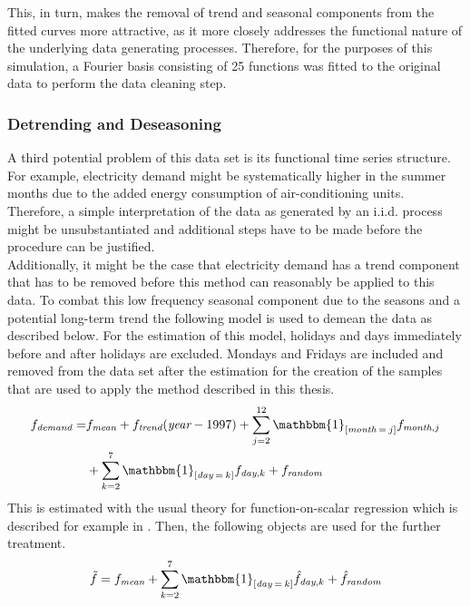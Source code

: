 \documentclass[12pt, a4paper]{article}
\theoremstyle{MAstyle} \newtheorem{assumption}{Assumption}[section]
\theoremstyle{MAstyle} \newtheorem{definition}{Definition}[section]
\theoremstyle{MAstyle} \newtheorem{theorem}{Theorem}[section]
\begin{document}
			This, in turn, makes the removal of trend and seasonal components from the fitted curves more attractive, as it more closely addresses the functional nature of the underlying data generating processes. Therefore, for the purposes of this simulation, a Fourier basis consisting of 25 functions was fitted to the original data to perform the data cleaning step.
			
			\subsubsection{Detrending and Deseasoning}
			A third potential problem of this data set is its functional time series structure. For example, electricity demand might be systematically higher in the summer months due to the added energy consumption of air-conditioning units. Therefore, a simple interpretation of the data as generated by an i.i.d. process might be unsubstantiated and additional steps have to be made before the procedure can be justified. \\
			Additionally, it might be the case that electricity demand has a trend component that has to be removed before this method can reasonably be applied to this data. To combat this low frequency seasonal component due to the seasons and a potential long-term trend the following model is used to demean the data as described below. For the estimation of this model, holidays and days immediately before and after holidays are excluded. Mondays and Fridays are included and removed from the data set after the estimation for the creation of the samples that are used to apply the method described in this thesis.
			\begin{equation}\label{Data_Cleaning}
				\begin{split}
					f_{\textit{demand}} = &f_{\textit{mean}} + f_{\textit{trend}}(\textit{year} - 1997) + \sum_{j = 2}^{12}\mathbbm{1}_{\left[\textit{month}\: = \: j\right]}f_{\textit{month}, j}\\
					 &+ \sum_{k = 2}^{7}\mathbbm{1}_{\left[\textit{day}\: = \: k\right]}f_{\textit{day}, k} + f_{\textit{random}}
				\end{split}	
			\end{equation}
			This is estimated with the usual theory for function-on-scalar regression which is described for example in \cite{ramsay_functional_2005}. Then, the following objects are used for the further treatment.
			\begin{equation}
				\tilde{f} = f_{\textit{mean}} + \sum_{k = 2}^{7}\mathbbm{1}_{\left[\textit{day}\: = \: k\right]}\hat{f}_{\textit{day}, k} + \hat{f}_{\textit{random}}
			\end{equation}
\end{document}
